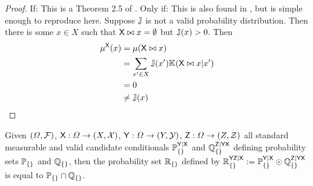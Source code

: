 \begin{proof}
If:
This is a Theorem 2.5 of \citet{ershov_extension_1975}.
Only if:
This is also found in \citet{ershov_extension_1975}, but is simple enough to reproduce here. Suppose $\mathbb{J}$ is not a valid probability distribution. Then there is some $x\in X$ such that $\mathsf{X}\bowtie x = \emptyset$ but $\mathbb{J}(x)>0$. Then
\begin{align}
    \mu^{\mathsf{X}}(x) &= \mu (\mathsf{X}\bowtie x)\\
    &= \sum_{x'\in X} \mathbb{J}(x') \mathbb{K}(\mathsf{X}\bowtie x|x')\\
    &= 0\\
    &\neq \mathbb{J}(x)
\end{align}
\end{proof}


\begin{lemma}\label{th:intersection}
Given $(\Omega,\mathcal{F})$, $\mathsf{X}:\Omega\to (X,\mathcal{X})$, $\mathsf{Y}:\Omega\to (Y,\mathcal{Y})$, $\mathsf{Z}:\Omega\to (Z,\mathcal{Z})$ all standard measurable and valid candidate conditionals $\mathbb{P}_{\{\}}^{\mathsf{Y}|\mathsf{X}}$ and $\mathbb{Q}_{\{\}}^{\mathsf{Z}|\mathsf{YX}}$ defining probability sets $\mathbb{P}_{\{\}}$ and $\mathbb{Q}_{\{\}}$, then the probability set $\mathbb{R}_{\{\}}$ defined by $\mathbb{R}_{\{\}}^{\mathsf{YZ}|\mathsf{X}}:=\mathbb{P}_{\{\}}^{\mathsf{Y}|\mathsf{X}}\odot \mathbb{Q}_{\{\}}^{\mathsf{Z}|\mathsf{YX}}$ is equal to $\mathbb{P}_{\{\}}\cap\mathbb{Q}_{\{\}}$.
\end{lemma}

